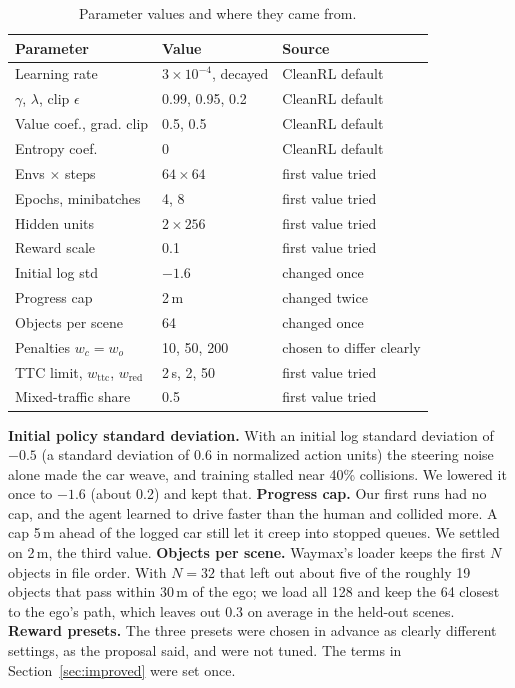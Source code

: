 \documentclass[conference]{IEEEtran}
\begin{document}
\begin{table}[t]
\caption{Parameter values and where they came from.}\label{tab:hyper}
\centering\small
\begin{tabular}{@{}p{}p{}p{}@{}}
\toprule
Parameter & Value & Source \\
\midrule
Learning rate & $3\times10^{-4}$, decayed & CleanRL default \\
$\gamma$, $\lambda$, clip $\epsilon$ & 0.99, 0.95, 0.2 & CleanRL default \\
Value coef., grad. clip & 0.5, 0.5 & CleanRL default \\
Entropy coef. & 0 & CleanRL default \\
Envs $\times$ steps & $64\times64$ & first value tried \\
Epochs, minibatches & 4, 8 & first value tried \\
Hidden units & $2\times256$ & first value tried \\
Reward scale & 0.1 & first value tried \\
Initial log std & $-1.6$ & changed once \\
Progress cap & 2\,m & changed twice \\
Objects per scene & 64 & changed once \\
Penalties $w_c{=}w_o$ & 10, 50, 200 & chosen to differ clearly \\
TTC limit, $w_\text{ttc}$, $w_\text{red}$ & 2\,s, 2, 50 & first value tried \\
Mixed-traffic share & 0.5 & first value tried \\
\bottomrule
\end{tabular}
\end{table}

\textbf{Initial policy standard deviation.} With an initial log standard deviation of
$-0.5$ (a standard deviation of 0.6 in normalized action units) the steering noise alone
made the car weave, and training stalled near 40\% collisions. We lowered it once to
$-1.6$ (about 0.2) and kept that.
\textbf{Progress cap.} Our first runs had no cap, and the agent learned to drive faster
than the human and collided more. A cap 5\,m ahead of the logged car still let it creep
into stopped queues. We settled on 2\,m, the third value.
\textbf{Objects per scene.} Waymax's loader keeps the first $N$ objects in file order.
With $N=32$ that left out about five of the roughly 19 objects that pass within 30\,m of
the ego; we load all 128 and keep the 64 closest to the ego's path, which leaves out 0.3 on average in the held-out scenes.
\textbf{Reward presets.} The three presets were chosen in advance as clearly different
settings, as the proposal said, and were not tuned. The terms in
Section~\ref{sec:improved} were set once.
\end{document}
